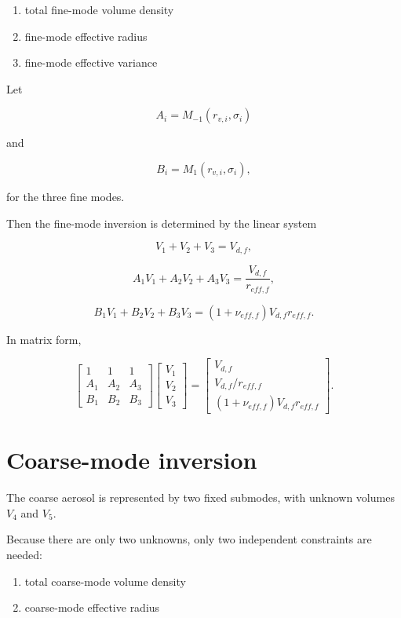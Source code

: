 \documentclass[
  11pt,
  letterpaper,
]{scrreprt}
\providecommand{\tightlist}{%
  \setlength{\itemsep}{0pt}\setlength{\parskip}{0pt}}
\begin{document}
\begin{enumerate}
\def\labelenumi{\arabic{enumi}.}
\tightlist
\item
  total fine-mode volume density
\item
  fine-mode effective radius
\item
  fine-mode effective variance
\end{enumerate}

Let

\[
A_i = M_{-1}(r_{v,i},\sigma_i)
\]

and

\[
B_i = M_{1}(r_{v,i},\sigma_i),
\]

for the three fine modes.

Then the fine-mode inversion is determined by the linear system

\[
V_1 + V_2 + V_3 = V_{d,f},
\]

\[
A_1V_1 + A_2V_2 + A_3V_3 = \frac{V_{d,f}}{r_{eff,f}},
\]

\[
B_1V_1 + B_2V_2 + B_3V_3 = (1+\nu_{eff,f})V_{d,f}r_{eff,f}.
\]

In matrix form,

\[
\begin{bmatrix}
1 & 1 & 1 \\
A_1 & A_2 & A_3 \\
B_1 & B_2 & B_3
\end{bmatrix}
\begin{bmatrix}
V_1 \\ V_2 \\ V_3
\end{bmatrix}
=
\begin{bmatrix}
V_{d,f} \\
V_{d,f}/r_{eff,f} \\
(1+\nu_{eff,f})V_{d,f}r_{eff,f}
\end{bmatrix}.
\]

\section{Coarse-mode inversion}\label{coarse-mode-inversion}

The coarse aerosol is represented by two fixed submodes, with unknown
volumes \(V_4\) and \(V_5\).

Because there are only two unknowns, only two independent constraints
are needed:

\begin{enumerate}
\def\labelenumi{\arabic{enumi}.}
\tightlist
\item
  total coarse-mode volume density
\item
  coarse-mode effective radius
\end{enumerate}
\end{document}
